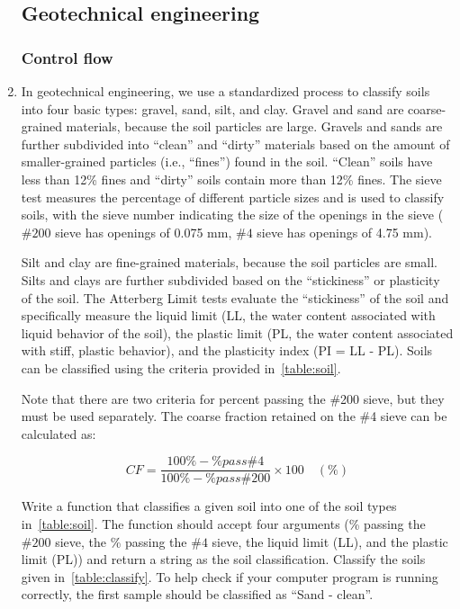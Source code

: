 \documentclass[a4paper,12pt]{article}
\begin{document}
\begin{enumerate}
	\subsection*{Geotechnical engineering}
	\subsubsection*{Control flow}
	\item In geotechnical engineering, we use a standardized process to classify soils into four basic types: gravel, sand, silt, and clay. 
	Gravel and sand are coarse-grained materials, because the soil particles are large. Gravels and sands are further subdivided into ``clean'' and ``dirty'' materials based on the amount of smaller-grained particles (i.e., ``fines'') found in the soil. ``Clean'' soils have less than 12\% fines and ``dirty'' soils contain more than 12\% fines.  The sieve test measures the percentage of different particle sizes and is used to classify soils, with the sieve number indicating the size of the openings in the sieve ($\#200$ sieve has openings of 0.075 mm, $\#4$ sieve has openings of 4.75 mm).
	
	Silt and clay are fine-grained materials, because the soil particles are small.  Silts and clays are further subdivided based on the ``stickiness'' or plasticity of the soil. The Atterberg Limit tests evaluate the ``stickiness'' of the soil and specifically measure the liquid limit (LL, the water content associated with liquid behavior of the soil), the plastic limit (PL, the water content associated with stiff, plastic behavior), and the plasticity index (PI = LL - PL). Soils can be classified using the criteria provided in~\cref{table:soil}.
	
	Note that there are two criteria for percent passing the \#200 sieve, but they must be used separately. The coarse fraction retained on the \#4 sieve can be calculated as:
	
	\begin{equation*}
		CF = \frac{100\% - \% pass\#4}{100\% - \% pass\#200} \times 100 \quad(\%)
	\end{equation*}
	
	Write a function that classifies a given soil into one of the soil types in~\cref{table:soil}. The function should accept four arguments (\% passing the $\#200$ sieve, the \% passing the $\#4$ sieve, the liquid limit (LL), and the plastic limit (PL)) and return a string as the soil classification. Classify the soils given in~\cref{table:classify}. 	To help check if your computer program is running correctly, the first sample should be classified as ``Sand - clean''.
	


\end{enumerate}
\end{document}
